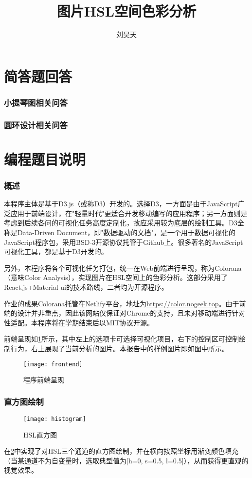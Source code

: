 \documentclass[a4paper,12pt]{article}
\title{图片HSL空间色彩分析}
\author{刘昊天}
\begin{document}
    \maketitle
    \part{简答题回答}
    \section{小提琴图相关问答}
    \section{圆环设计相关问答}
    \part{编程题目说明}
    \section{概述}
    本程序主体是基于D3.js（或称D3）开发的。选择D3，一方面是由于JavaScript广泛应用于前端设计，在"轻量时代"更适合开发移动编写的应用程序；另一方面则是考虑到后续各问的可视化任务高度定制化，故应采用较为底层的绘制工具。D3全称是Data-Driven Document，即"数据驱动的文档"，是一个用于数据可视化的JavaScript程序包，采用BSD-3开源协议托管于Github上。很多著名的JavaScript可视化工具，都是基于D3开发的。

    另外，本程序将各个可视化任务打包，统一在Web前端进行呈现，称为Colorana（意味Color Analysis），实现图片在HSL空间上的色彩分析。这部分采用了React.js+Material-ui的技术路线，二者均为开源程序。

    作业的成果Colorana托管在Netlify平台，地址为\url{https://color.nogeek.top}。由于前端的设计并非重点，因此该网站仅保证对Chrome的支持，且未对移动端进行针对性适配。本程序将在学期结束后以MIT协议开源。

    前端呈现如\cref{fig:frontend}所示，其中左上的选项卡可选择可视化项目，右下的控制区可控制绘制行为，右上展现了当前分析的图片。本报告中的样例图片即如图中所示。
    \begin{figure}[htbp]
      \centering
      \texttt{[image: frontend]}
      \caption{程序前端呈现}
      \label{fig:frontend}
    \end{figure}
    \section{直方图绘制}
    \begin{figure}[htbp]
      \centering
      \texttt{[image: histogram]}
      \caption{HSL直方图}
      \label{fig:histogram}
    \end{figure}
    在\cref{fig:histogram}中实现了对HSL三个通道的直方图绘制，并在横向按照坐标用渐变颜色填充（当某通道不为自变量时，选取典型值为[h=0, s=0.5, l=0.5]），从而获得更直观的视觉效果。
\end{document}
